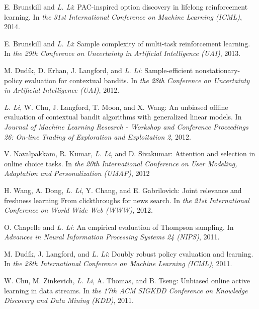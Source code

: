 \documentclass[10pt,twoside,letterpaper]{article}
\newcommand{\selffont}[1]{{\textit{#1}}}
\newcommand{\venuefont}[1]{{\textit{#1}}}
\newcommand{\myself}{\selffont{L. Li}}
\begin{document}
\begin{compactenum}[(C1)]
\item{E. Brunskill and \myself: PAC-inspired option discovery in lifelong reinforcement learning.  In \venuefont{the 31st International Conference on Machine Learning (ICML)}, 2014.}

\item{E. Brunskill and \myself: Sample complexity of multi-task reinforcement learning.  In \venuefont{the 29th Conference on Uncertainty in Artificial Intelligence (UAI)}, 2013.}

\item{M. Dud\'ik, D. Erhan, J. Langford, and \myself: Sample-efficient nonstationary-policy evaluation for contextual bandits.  In \venuefont{the 28th Conference on Uncertainty in Artificial Intelligence (UAI)}, 2012.}

\item{\myself, W. Chu, J. Langford, T. Moon, and X. Wang: An unbiased offline evaluation of contextual bandit algorithms with generalized linear models.  In \venuefont{Journal of Machine Learning Research - Workshop and Conference Proceedings 26: On-line Trading of Exploration and Exploitation 2}, 2012.}

\item{V. Navalpakkam, R. Kumar, \myself, and D. Sivakumar: Attention and selection in online choice tasks.  In \venuefont{the 20th International Conference on User Modeling, Adaptation and Personalization (UMAP)}, 2012}

\item{H. Wang, A. Dong, \myself, Y. Chang, and E. Gabrilovich: Joint relevance and freshness learning From clickthroughs for news search.  In \venuefont{the 21st International Conference on World Wide Web (WWW)}, 2012.}

\item{O. Chapelle and \myself: An empirical evaluation of Thompson sampling.  In \venuefont{Advances in Neural Information Processing Systems 24 (NIPS)}, 2011.}

\item{M. Dud\'ik, J. Langford, and \myself: Doubly robust policy evaluation and learning.  In \venuefont{the 28th International Conference on Machine
Learning (ICML)}, 2011.}

\item{W. Chu, M. Zinkevich, \myself, A. Thomas, and B. Tseng: Unbiased online active learning in data streams.  In \venuefont{the 17th ACM SIGKDD Conference on Knowledge Discovery and Data Mining (KDD)}, 2011.}


\end{compactenum}
\end{document}

